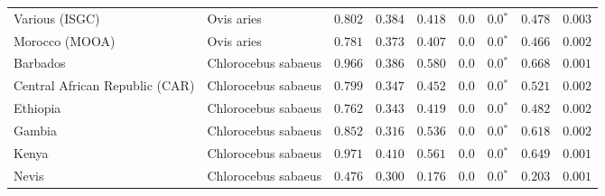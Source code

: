 \begin{center}
\begin{adjustbox}{width = 1\textwidth}
\begin{tabular}{|l|l|r|r|r|r|r|r|r|}
                 Various (ISGC) &           Ovis aries &                                        $ 0.802$ &                                           $ 0.384$ &                      $ 0.418$ &            $0.0$ &                  $\bm{0.0{^*}}$ &                                           $ 0.478$ &           $ 0.003$ \\
                 Morocco (MOOA) &           Ovis aries &                                        $ 0.781$ &                                           $ 0.373$ &                      $ 0.407$ &            $0.0$ &                  $\bm{0.0{^*}}$ &                                           $ 0.466$ &           $ 0.002$ \\
                       Barbados &  Chlorocebus sabaeus &                                        $ 0.966$ &                                           $ 0.386$ &                      $ 0.580$ &            $0.0$ &                  $\bm{0.0{^*}}$ &                                           $ 0.668$ &           $ 0.001$ \\
 Central African Republic (CAR) &  Chlorocebus sabaeus &                                        $ 0.799$ &                                           $ 0.347$ &                      $ 0.452$ &            $0.0$ &                  $\bm{0.0{^*}}$ &                                           $ 0.521$ &           $ 0.002$ \\
                       Ethiopia &  Chlorocebus sabaeus &                                        $ 0.762$ &                                           $ 0.343$ &                      $ 0.419$ &            $0.0$ &                  $\bm{0.0{^*}}$ &                                           $ 0.482$ &           $ 0.002$ \\
                         Gambia &  Chlorocebus sabaeus &                                        $ 0.852$ &                                           $ 0.316$ &                      $ 0.536$ &            $0.0$ &                  $\bm{0.0{^*}}$ &                                           $ 0.618$ &           $ 0.002$ \\
                          Kenya &  Chlorocebus sabaeus &                                        $ 0.971$ &                                           $ 0.410$ &                      $ 0.561$ &            $0.0$ &                  $\bm{0.0{^*}}$ &                                           $ 0.649$ &           $ 0.001$ \\
                          Nevis &  Chlorocebus sabaeus &                                        $ 0.476$ &                                           $ 0.300$ &                      $ 0.176$ &            $0.0$ &                  $\bm{0.0{^*}}$ &                                           $ 0.203$ &           $ 0.001$ \\

\end{tabular}
\end{adjustbox}
\end{center}
